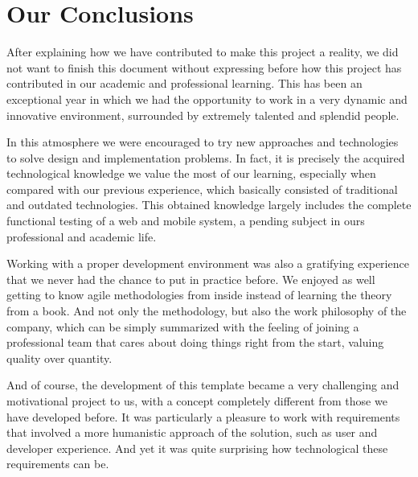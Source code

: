   
\section{Our Conclusions}
After explaining how we have contributed to make this project a reality, we did not want to finish this document without expressing before how this project has contributed in our academic and professional learning. This has been an exceptional year in which we had the opportunity to work in a very dynamic and innovative environment, surrounded by extremely talented and splendid people.

In this atmosphere we were encouraged to try new approaches and technologies to solve design and implementation problems. In fact, it is precisely the acquired technological knowledge we value the most of our learning, especially when compared with our previous experience, which basically consisted of traditional and outdated technologies. This obtained knowledge largely includes the complete functional testing of a web and mobile system, a pending subject in ours professional and academic life.

Working with a proper development environment was also a gratifying experience that we never had the chance to put in practice before. We enjoyed as well getting to know agile methodologies from inside instead of learning the theory from a book. And not only the methodology, but also the work philosophy of the company, which can be simply summarized with the feeling of joining a professional team that cares about doing things right from the start, valuing quality over quantity.

And of course, the development of this template became a very challenging and motivational project to us, with a concept completely different from those we have developed before. It was particularly a pleasure to work with requirements that involved a more humanistic approach of the solution, such as user and developer experience. And yet it was quite surprising how technological these requirements can be.